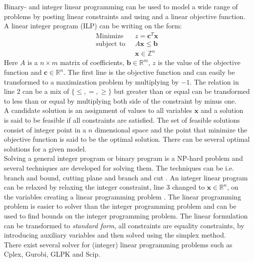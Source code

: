 Binary- and integer linear programming can be used to model a wide range of problems by posting linear constraints and 
using and a linear objective function. A linear integer program (ILP) can be writing on the form: 
\begin{align}
 \text{Minimize }\; &z =  \mathbf{c}^T\mathbf{x} \\ 
 \text{subject to } \; & A\mathbf{x} \leq \mathbf{b} \\ 
 & \mathbf{x} \in \mathbb{Z}^n
\end{align}
Here $A$ is a $n \times m$ matrix of coefficients, $\mathbf{b} \in \mathbb{R}^m$, $z$ is the value of the objective 
function and $\mathbf{c} \in \mathbb{R}^n$. The first line is the objective function and can easily be transformed to a 
maximization problem by multiplying by $-1$. The relation in line 2 can be a mix of $\{\leq,=,\geq\}$ but greater 
than or equal can be transformed to less than or equal by multiplying both side of the constraint by minus one.  \\ 
A candidate solution is an assignment of values to all variables $\mathbf{x}$ and a solution is said to be feasible if 
all constraints are satisfied. The set of feasible solutions consist of integer point in a $n$ dimensional space and 
the point that minimize the objective function is said to be the optimal solution. There can be several optimal 
solutions for a given model. \\
Solving a general integer program or binary program is a NP-hard problem \cite[p.30]{ilpbog} and several techniques are 
developed for solving them. The techniques can be i.e. branch and bound, cutting plane and branch and cut 
\cite[p.31]{ilpbog}. An integer linear program can be relaxed by relaxing the integer constraint, line 3 changed to 
$\mathbf{x} \in \mathbb{R}^n$, on the variables creating a linear programming problem \cite[p. 30]{ilpbog}. The linear 
programming problem is easier to solver than the integer programming problem and can be used to find bounds on the 
integer programming problem. The linear formulation can be transformed to \emph{standard form}, all constraints are 
equality constraints, by introducing auxiliary variables and then solved using the simplex method. \\ 
There exist several solver for (integer) linear programming problems such as Cplex, Gurobi, GLPK and Scip. 